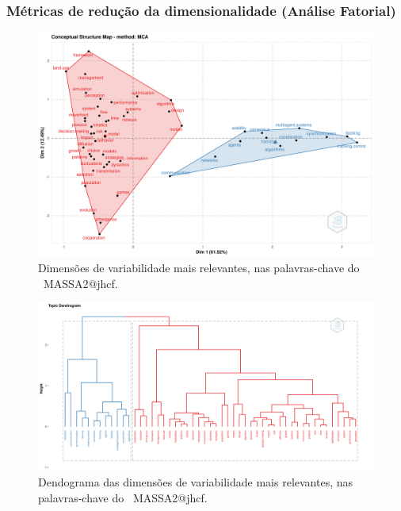 \subsubsection{Métricas de redução da dimensionalidade (Análise Fatorial)}

\begin{figure}
    \centering
    \includegraphics[width=1\textwidth]{exploratory-data-analysis/jhcf/PesqBibliogr/SimulacaoMultiagente/WoS-20220203/Estrutura/Conceitual/MASSA2-FactorialAnalysis-MCA-FactorialMap.png}
    \caption{Dimensões de variabilidade mais relevantes, nas palavras-chave do  \dataset\ MASSA2@jhcf.}
    \label{fig:MASSA2-FactorialAnalysis-MCA-FactorialMap}
\end{figure}

\begin{figure}
    \centering
    \includegraphics[width=1\textwidth]{exploratory-data-analysis/jhcf/PesqBibliogr/SimulacaoMultiagente/WoS-20220203/Estrutura/Conceitual/MASSA2-FactorialAnalysis-MCA-Dendrogram.png}
    \caption{Dendograma das dimensões de variabilidade mais relevantes, nas palavras-chave do  \dataset\ MASSA2@jhcf.}
    \label{fig:MASSA2-FactorialAnalysis-MCA-Dendrogram}
\end{figure}

